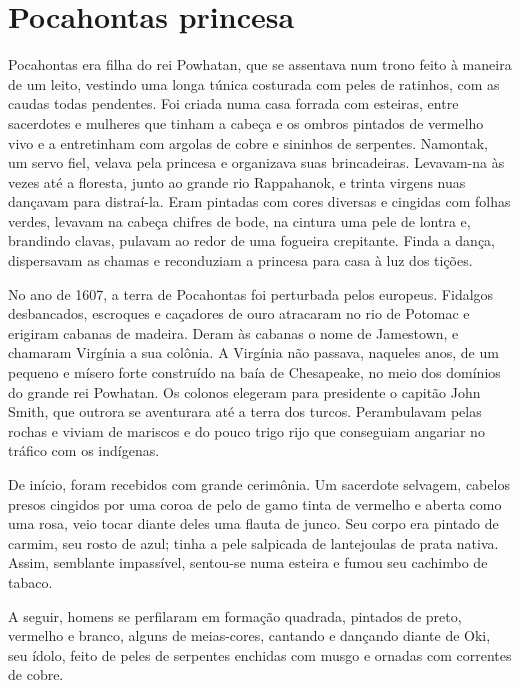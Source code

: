 \chapter{Pocahontas princesa}

Pocahontas era filha do rei Powhatan, que se assentava num trono feito à
maneira de um leito, vestindo uma longa túnica costurada com peles de
ratinhos, com as caudas todas pendentes. Foi criada numa casa forrada com
esteiras, entre sacerdotes e mulheres que tinham a cabeça e os ombros
pintados de vermelho vivo e a entretinham com argolas de cobre e sininhos
de serpentes. Namontak, um servo fiel, velava pela princesa e organizava
suas brincadeiras. Levavam-na às vezes até a floresta, junto ao grande rio
Rappahanok, e trinta virgens nuas dançavam para distraí-la. Eram pintadas
com cores diversas e cingidas com folhas verdes, levavam na cabeça chifres
de bode, na cintura uma pele de lontra e, brandindo clavas, pulavam ao
redor de uma fogueira crepitante. Finda a dança, dispersavam as chamas e
reconduziam a princesa para casa à luz dos tições.

No ano de 1607, a terra de Pocahontas foi perturbada pelos europeus.
Fidalgos desbancados, escroques e caçadores de ouro atracaram no rio de
Potomac e erigiram cabanas de madeira. Deram às cabanas o nome de
Jamestown, e chamaram Virgínia a sua colônia. A Virgínia não passava,
naqueles anos, de um pequeno e mísero forte construído na baía de
Chesapeake, no meio dos domínios do grande rei Powhatan. Os colonos
elegeram para presidente o capitão John Smith, que outrora se aventurara
até a terra dos turcos. Perambulavam pelas rochas e viviam de mariscos e
do pouco trigo rijo que conseguiam angariar no tráfico com os indígenas.

De início, foram recebidos com grande cerimônia. Um sacerdote selvagem,
cabelos presos cingidos por uma coroa de pelo de gamo tinta de vermelho e
aberta como uma rosa, veio tocar diante deles uma flauta de junco. Seu
corpo era pintado de carmim, seu rosto de azul; tinha a pele salpicada de
lantejoulas de prata nativa. Assim, semblante impassível, sentou-se numa
esteira e fumou seu cachimbo de tabaco.

A seguir, homens se perfilaram em formação quadrada, pintados de preto,
vermelho e branco, alguns de meias-cores, cantando e dançando diante de
Oki, seu ídolo, feito de peles de serpentes enchidas com musgo e ornadas
com correntes de cobre.

